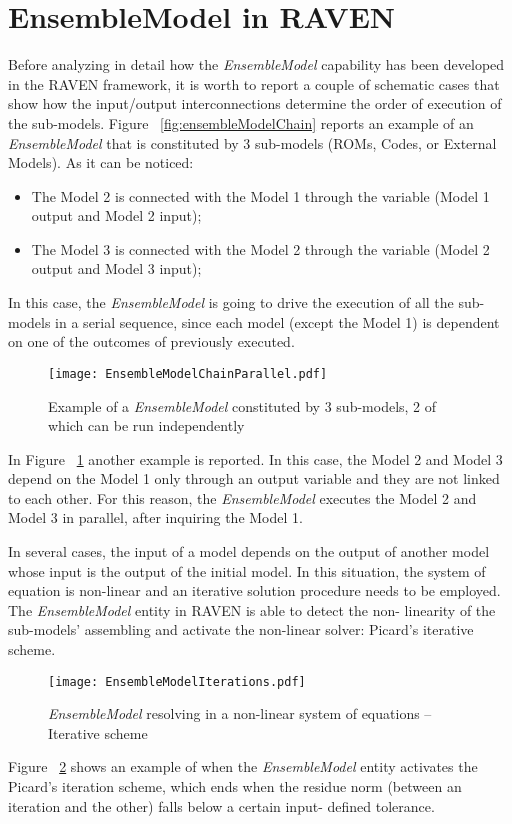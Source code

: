 \section{EnsembleModel in RAVEN}
\label{sec:ensembleModel}
Before analyzing in detail how the \textit{EnsembleModel}  capability has been 
developed in the
RAVEN framework, it is worth to report a couple of schematic cases that show how the 
input/output interconnections
determine the order of execution of the sub-models. Figure ~\ref{fig:ensembleModelChain} reports an example of an \textit{EnsembleModel} that is 
constituted by 3
sub-models (ROMs, Codes, or External Models). As it can be noticed:
\begin{itemize}
  \item The Model 2 is connected with the Model 1 through the variable (Model 1 output 
  and Model 2 input);
  \item The Model 3 is connected with the Model 2 through the variable (Model 2 output 
  and Model 3 input);
\end{itemize}
In this case, the \textit{EnsembleModel} is going to drive the execution of all the sub-
models in a serial sequence, since each model (except the Model 1) is dependent on 
one of the outcomes of previously executed.

\begin{figure}
    \centering
    \texttt{[image: EnsembleModelChainParallel.pdf]}
    \caption{Example of a  \textit{EnsembleModel} constituted by 3 sub-models, 2 of which can be run independently}
    \label{fig:ensembleModelChainParallel}
\end{figure}

In Figure ~\ref{fig:ensembleModelChainParallel} another example is reported. In this 
case, the Model 2 and Model 3 depend on the Model 1 only through an
output variable and they are not linked to each other. For this reason, the 
\textit{EnsembleModel} executes the Model 2 and Model 3 in parallel, after inquiring the 
Model 1.

In several cases, the input of a model depends on the output of another model whose 
input is the output of
the initial model. In this situation, the system of equation is non-linear and an iterative 
solution procedure needs
to be employed. The \textit{EnsembleModel} entity in RAVEN is able to detect the non-
linearity of the sub-models’
assembling and activate the non-linear solver: Picard’s iterative scheme. 
\begin{figure}
    \centering
    \texttt{[image: EnsembleModelIterations.pdf]}
    \caption{\textit{EnsembleModel} resolving in a non-linear system of equations – Iterative scheme}
    \label{fig:ensembleModelPicard}
\end{figure}
Figure ~\ref{fig:ensembleModelPicard} shows an example of when the
\textit{EnsembleModel} entity activates the Picard’s iteration scheme, which ends when 
the residue norm (between an iteration and the other) falls below a certain input-
defined tolerance.

